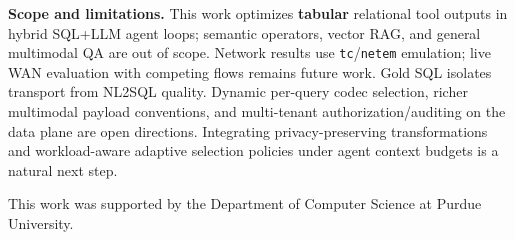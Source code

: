 \documentclass[sigconf, nonacm]{acmart}
\begin{document}
\smallskip
\noindent\textbf{Scope and limitations.}
This work optimizes \textbf{tabular} relational tool outputs in hybrid SQL+LLM agent loops; semantic operators, vector RAG, and general multimodal QA are out of scope. Network results use \texttt{tc}/\texttt{netem} emulation; live WAN evaluation with competing flows remains future work. Gold SQL isolates transport from NL2SQL quality. Dynamic per-query codec selection, richer multimodal payload conventions, and multi-tenant authorization/auditing on the data plane are open directions. Integrating privacy-preserving transformations and workload-aware adaptive selection policies under agent context budgets is a natural next step.

\begin{acks}
This work was supported by the Department of Computer Science at Purdue University.
\end{acks}



\end{document}
